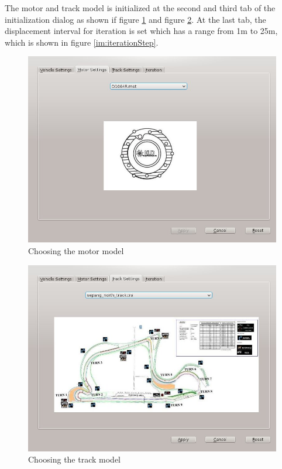 The motor and track model is initialized at the second and third tab of the initialization dialog as shown if figure \ref{im:motorSettings} and figure \ref{im:trackSettings}. At the last tab, the displacement interval for iteration is set which has a range from 1m to 25m, which is shown in figure \ref{im:iterationStep}.

\begin{figure}[htb]
	\centering
	\includegraphics[width=5in]{images/motor_settings.jpg}
	\caption{Choosing the motor model}
	\label{im:motorSettings}
\end{figure}

\begin{figure}[htb]
	\centering
	\includegraphics[width=5in]{images/track_settings.jpg}
	\caption{Choosing the track model}
	\label{im:trackSettings}
\end{figure}

